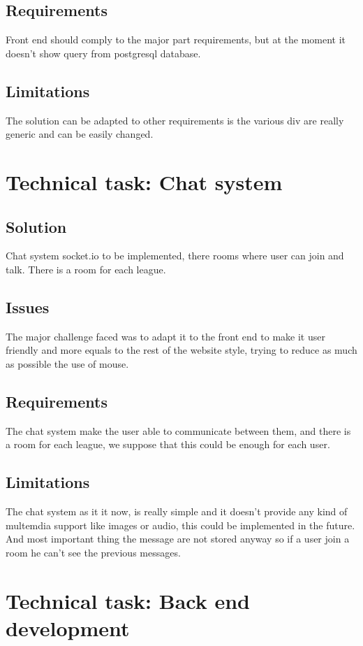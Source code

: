 \documentclass[conference]{IEEEtran}
\begin{document}
\subsection{Requirements}
Front end should comply to the major part requirements, but at the moment it doesn't show query from postgresql database.
\subsection{Limitations}
The solution can be adapted to other requirements is the various div are really generic and can be easily changed.

\section{Technical task: Chat system}
\subsection{Solution}
Chat system socket.io to be implemented, there rooms where user can join and talk. There is a room for each league.

\subsection{Issues}
The major challenge faced was to adapt it to the front end to make it user friendly and more equals to the rest of the website style, trying to reduce as much as possible the use of mouse.
\subsection{Requirements}
The chat system make the user able to communicate between them, and there is a room for each league, we suppose that this could be enough for each user. 

\subsection{Limitations}
The chat system as it it now, is really simple and it doesn't provide any kind of multemdia support like images or audio, this could be implemented in the future.
And most important thing the message are not stored anyway so if a user join a room he can't see the previous messages.
\section{Technical task: Back end development}
\end{document}
